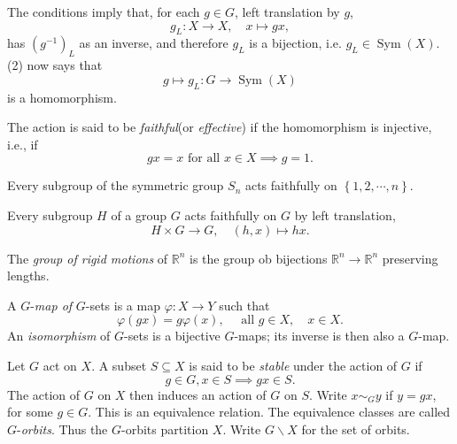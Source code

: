 The conditions imply that, for each \( g \in G \), left translation by \( g \),
\[
  g_L: X \to X,\quad x \mapsto gx,
\]
has \( (g^{-1})_L \) as an inverse, and therefore \( g_L \) is a bijection, i.e. \( g_L \in \operatorname{Sym}(X) \).
(2) now says that
\[
  g \mapsto g_L: G \to \operatorname{Sym}(X)
\]
is a homomorphism.

\begin{definition}
  \label{definition-faithful}
  The action is said to be \emph{faithful}(or \emph{effective}) if the homomorphism is injective, i.e., if
  \[
    gx = x \text{ for all } x \in X \implies g = 1.
  \]
\end{definition}

\begin{example}
  \label{example-symmetric-group-faithfully-action}
  Every subgroup of the symmetric group \( S_n \) acts faithfully on \( \left\lbrace 1, 2, \cdots, n \right\rbrace \).
\end{example}

\begin{example}
  \label{example-subgroup-action}
  Every subgroup \( H \) of a group \( G \) acts faithfully on \( G \) by left translation,
  \[
    H \times G \to G, \quad (h, x) \mapsto hx.
  \]
\end{example}

\begin{example}
  \label{example-rigid-motion-action}
  The \emph{group of rigid motions} of \( \mathbb{R}^n \) is the group ob bijections \( \mathbb{R}^n \to \mathbb{R}^n \) preserving lengths.
\end{example}

\begin{definition}
  \label{definition-G-map}
  \label{definition-G-map-isomorphism}
  A \( G \)-\emph{map of} \( G \)-sets is a map \( \varphi: X \to Y \) such that
  \[
    \varphi(gx) = g\varphi(x),\quad \text{ all } g \in X,\quad x \in X.
  \]
  An \emph{isomorphism} of \( G \)-sets is a bijective \( G \)-maps; its inverse is then also a \( G \)-map.
\end{definition}


\begin{definition}
  \label{definition-stable-under-action}
  \label{definition-G-orbit}
  Let \( G \) act on \( X \).
  A subset \( S \subseteq X \) is said to be \emph{stable} under the action of \( G \) if
  \[
    g \in G, x \in S \implies gx \in S.
  \]
  The action of \( G \) on \( X \) then induces an action of \( G \) on \( S \).
  Write \( x \sim_G y \) if \( y = gx \), for some \( g \in G \).
  This is an equivalence relation.
  The equivalence classes are called \( G \)-\emph{orbits}.
  Thus the \( G \)-orbits partition \( X \).
  Write \( G \backslash X \) for the set of orbits.
\end{definition}

